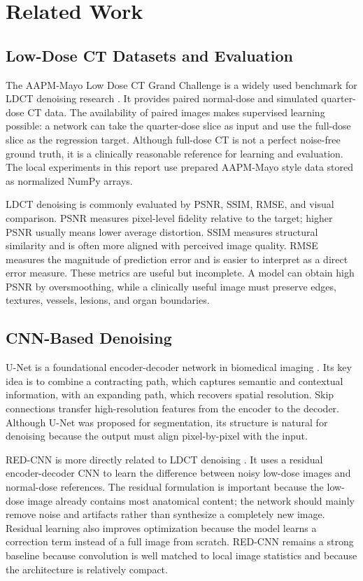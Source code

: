 \documentclass[journal]{IEEEtran}
\begin{document}
\section{Related Work}
\subsection{Low-Dose CT Datasets and Evaluation}
The AAPM-Mayo Low Dose CT Grand Challenge is a widely used benchmark for LDCT denoising research \cite{aapm2016ldct}. It provides paired normal-dose and simulated quarter-dose CT data. The availability of paired images makes supervised learning possible: a network can take the quarter-dose slice as input and use the full-dose slice as the regression target. Although full-dose CT is not a perfect noise-free ground truth, it is a clinically reasonable reference for learning and evaluation. The local experiments in this report use prepared AAPM-Mayo style data stored as normalized NumPy arrays.

LDCT denoising is commonly evaluated by PSNR, SSIM, RMSE, and visual comparison. PSNR measures pixel-level fidelity relative to the target; higher PSNR usually means lower average distortion. SSIM measures structural similarity and is often more aligned with perceived image quality. RMSE measures the magnitude of prediction error and is easier to interpret as a direct error measure. These metrics are useful but incomplete. A model can obtain high PSNR by oversmoothing, while a clinically useful image must preserve edges, textures, vessels, lesions, and organ boundaries.

\subsection{CNN-Based Denoising}
U-Net is a foundational encoder-decoder network in biomedical imaging \cite{ronneberger2015unet}. Its key idea is to combine a contracting path, which captures semantic and contextual information, with an expanding path, which recovers spatial resolution. Skip connections transfer high-resolution features from the encoder to the decoder. Although U-Net was proposed for segmentation, its structure is natural for denoising because the output must align pixel-by-pixel with the input.

RED-CNN is more directly related to LDCT denoising \cite{chen2017redcnn}. It uses a residual encoder-decoder CNN to learn the difference between noisy low-dose images and normal-dose references. The residual formulation is important because the low-dose image already contains most anatomical content; the network should mainly remove noise and artifacts rather than synthesize a completely new image. Residual learning also improves optimization because the model learns a correction term instead of a full image from scratch. RED-CNN remains a strong baseline because convolution is well matched to local image statistics and because the architecture is relatively compact.
\end{document}
